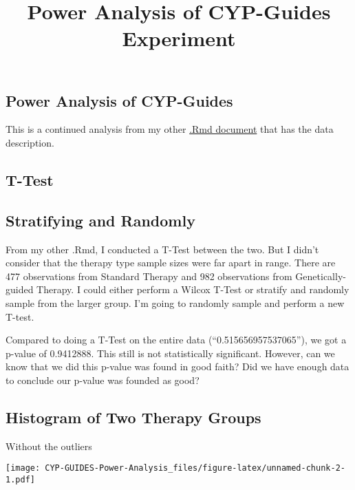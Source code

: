 \documentclass[
]{article}
\title{Power Analysis of CYP-Guides Experiment}
\author{}
\date{\vspace{-2.5em}}
\begin{document}
\maketitle

\hypertarget{power-analysis-of-cyp-guides}{%
\subsection{Power Analysis of
CYP-Guides}\label{power-analysis-of-cyp-guides}}

This is a continued analysis from my other
\href{https://github.com/kittysocks/portfolio/blob/main/R/CYP-GUIDES-Power-Analysis.docx}{.Rmd
document} that has the data description.

\hypertarget{t-test}{%
\subsection{T-Test}\label{t-test}}

\hypertarget{stratifying-and-randomly}{%
\subsection{Stratifying and Randomly}\label{stratifying-and-randomly}}

From my other .Rmd, I conducted a T-Test between the two. But I didn't
consider that the therapy type sample sizes were far apart in range.
There are 477 observations from Standard Therapy and 982 observations
from Genetically-guided Therapy. I could either perform a Wilcox T-Test
or stratify and randomly sample from the larger group. I'm going to
randomly sample and perform a new T-test.

Compared to doing a T-Test on the entire data (``0.515656957537065''),
we got a p-value of 0.9412888. This still is not statistically
significant. However, can we know that we did this p-value was found in
good faith? Did we have enough data to conclude our p-value was founded
as good?

\hypertarget{histogram-of-two-therapy-groups}{%
\subsection{Histogram of Two Therapy
Groups}\label{histogram-of-two-therapy-groups}}

Without the outliers

\texttt{[image: CYP-GUIDES-Power-Analysis\_files/figure-latex/unnamed-chunk-2-1.pdf]}
\end{document}
